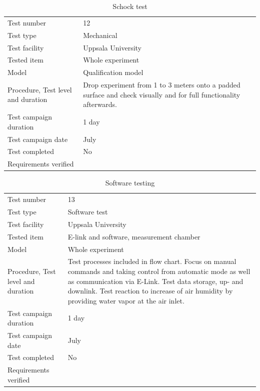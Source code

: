 \begin{table}[H]
\centering
\caption{Schock test}
\label{tab:test_shock}
\begin{tabular}{L{5cm}L{10cm}}
\toprule
Test number & 12 \\
Test type & Mechanical \\
Test facility & Uppsala University \\
Tested item & Whole experiment \\
Model & Qualification model \\
Procedure, Test level and duration & Drop experiment from 1 to 3 meters onto a padded surface and check visually and for full functionality afterwards. \\
Test campaign duration & 1 day \\
Test campaign date & July \\
Test completed & No \\
Requirements verified & \\
\bottomrule
\end{tabular}
\end{table}


\begin{table}[H]
\centering
\caption{Software testing}
\label{tab:test13}
\begin{tabular}{L{5cm}L{10cm}}
\toprule
Test number & 13 \\
Test type & Software test \\
Test facility & Uppsala University \\
Tested item & E-link and software, measurement chamber \\
Model & Whole experiment \\
Procedure, Test level and duration & Test processes included in flow chart. Focus on manual commands and taking control from automatic mode as well as communication via E-Link. Test data storage, up- and downlink. Test reaction to increase of air humidity by providing water vapor at the air inlet.\\
Test campaign duration & 1 day \\
Test campaign date & July \\
Test completed & No \\
Requirements verified & \\
\bottomrule
\end{tabular}
\end{table}


